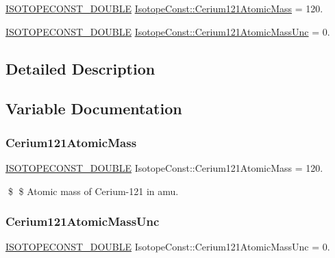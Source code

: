 \begin{DoxyCompactItemize}
\item 
\mbox{\hyperlink{group___isotope_const-_macros_ga8f45a7272ce02c0b4c65c44636ed719a}{I\+S\+O\+T\+O\+P\+E\+C\+O\+N\+S\+T\+\_\+\+D\+O\+U\+B\+LE}} \mbox{\hyperlink{group___isotope_const-_cerium-_ce121_gac120d7be7a4bbc46e1c99fda2b76d844}{Isotope\+Const\+::\+Cerium121\+Atomic\+Mass}} = 120.
\item 
\mbox{\hyperlink{group___isotope_const-_macros_ga8f45a7272ce02c0b4c65c44636ed719a}{I\+S\+O\+T\+O\+P\+E\+C\+O\+N\+S\+T\+\_\+\+D\+O\+U\+B\+LE}} \mbox{\hyperlink{group___isotope_const-_cerium-_ce121_ga284245603e1e628d4b5bb1d96e482621}{Isotope\+Const\+::\+Cerium121\+Atomic\+Mass\+Unc}} = 0.
\end{DoxyCompactItemize}


\subsection{Detailed Description}


\subsection{Variable Documentation}
\mbox{\label{group___isotope_const-_cerium-_ce121_gac120d7be7a4bbc46e1c99fda2b76d844}} 
\subsubsection{\texorpdfstring{Cerium121\+Atomic\+Mass}{Cerium121AtomicMass}}
{\footnotesize\ttfamily \mbox{\hyperlink{group___isotope_const-_macros_ga8f45a7272ce02c0b4c65c44636ed719a}{I\+S\+O\+T\+O\+P\+E\+C\+O\+N\+S\+T\+\_\+\+D\+O\+U\+B\+LE}} Isotope\+Const\+::\+Cerium121\+Atomic\+Mass = 120.}

\$ \$ Atomic mass of Cerium-\/121 in amu. \mbox{\label{group___isotope_const-_cerium-_ce121_ga284245603e1e628d4b5bb1d96e482621}} 
\subsubsection{\texorpdfstring{Cerium121\+Atomic\+Mass\+Unc}{Cerium121AtomicMassUnc}}
{\footnotesize\ttfamily \mbox{\hyperlink{group___isotope_const-_macros_ga8f45a7272ce02c0b4c65c44636ed719a}{I\+S\+O\+T\+O\+P\+E\+C\+O\+N\+S\+T\+\_\+\+D\+O\+U\+B\+LE}} Isotope\+Const\+::\+Cerium121\+Atomic\+Mass\+Unc = 0.}

